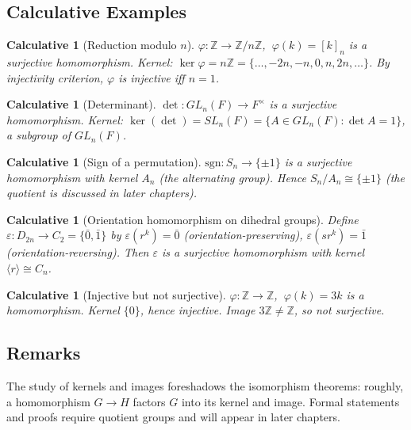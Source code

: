 \documentclass[12pt]{article}
\newtheorem{calculative}[theorem]{Calculative}
\theoremstyle{definition}
\begin{document}
\subsection*{Calculative Examples}

\begin{calculative}[Reduction modulo $n$]
$\varphi:\mathbb{Z}\to \mathbb{Z}/n\mathbb{Z}$, $\ \varphi(k)=[k]_n$ is a surjective homomorphism.
Kernel: $\ker\varphi=n\mathbb{Z}=\{\dots,-2n,-n,0,n,2n,\dots\}$.
By injectivity criterion, $\varphi$ is injective iff $n=1$.
\end{calculative}

\begin{calculative}[Determinant]
$\det:GL_n(F)\to F^\times$ is a surjective homomorphism.
Kernel: $\ker(\det)=SL_n(F)=\{A\in GL_n(F):\det A=1\}$, a subgroup of $GL_n(F)$.
\end{calculative}

\begin{calculative}[Sign of a permutation]
$\mathrm{sgn}:S_n\to \{\pm1\}$ is a surjective homomorphism with kernel $A_n$ (the alternating group).
Hence $S_n/A_n\cong \{\pm1\}$ (the quotient is discussed in later chapters).
\end{calculative}

\begin{calculative}[Orientation homomorphism on dihedral groups]
Define $\varepsilon:D_{2n}\to C_2=\{\bar 0,\bar 1\}$ by
$\varepsilon(r^k)=\bar 0$ (orientation-preserving), $\varepsilon(sr^k)=\bar 1$ (orientation-reversing).
Then $\varepsilon$ is a surjective homomorphism with kernel $\langle r\rangle\cong C_n$.
\end{calculative}

\begin{calculative}[Injective but not surjective]
$\varphi:\mathbb{Z}\to \mathbb{Z}$, $\ \varphi(k)=3k$ is a homomorphism. Kernel $\{0\}$, hence injective.
Image $3\mathbb{Z}\neq \mathbb{Z}$, so not surjective.
\end{calculative}

\subsection*{Remarks}
The study of kernels and images foreshadows the isomorphism theorems:
roughly, a homomorphism $G\to H$ factors $G$ into its kernel and image.
Formal statements and proofs require quotient groups and will appear in later chapters.

\newpage
\end{document}
